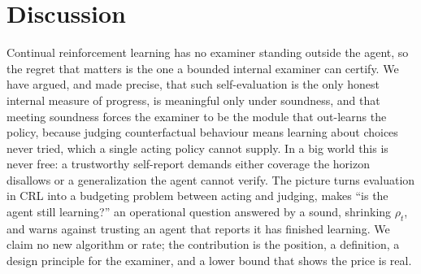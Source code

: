 \documentclass[10pt]{article} %
\theoremstyle{definition}
\theoremstyle{plain}
\begin{document}
\section{Discussion}
\label{sec:discussion}

Continual reinforcement learning has no examiner standing outside the agent, so the regret that matters is the one a bounded internal examiner can certify. We have argued, and made precise, that such self-evaluation is the only honest internal measure of progress, is meaningful only under soundness, and that meeting soundness forces the examiner to be the module that out-learns the policy, because judging counterfactual behaviour means learning about choices never tried, which a single acting policy cannot supply. In a big world this is never free: a trustworthy self-report demands either coverage the horizon disallows or a generalization the agent cannot verify. The picture turns evaluation in CRL into a budgeting problem between acting and judging, makes ``is the agent still learning?'' an operational question answered by a sound, shrinking $\rho_t$, and warns against trusting an agent that reports it has finished learning. We claim no new algorithm or rate; the contribution is the position, a definition, a design principle for the examiner, and a lower bound that shows the price is real.



\end{document}

